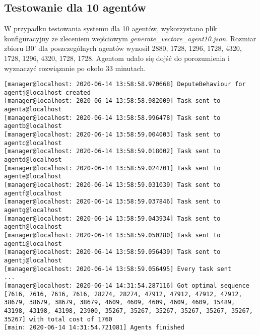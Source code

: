\subsection{Testowanie dla 10 agentów}
W przypadku testowania systemu dla 10 agentów, wykorzystano plik konfiguracyjny ze zleceniem wejściowym \textit{generate\_vectore\_agent10.json}. Rozmiar zbioru B0' dla poszczególnych agentów wynosił 2880, 1728, 1296, 1728, 4320, 1728, 1296, 4320, 1728, 1728. Agentom udało się dojść do porozumienia i wyznaczyć rozwiązanie po około 33 minutach.
\begin{lstlisting}
[manager@localhost: 2020-06-14 13:58:58.970668] DeputeBehaviour for agentj@localhost created
[manager@localhost: 2020-06-14 13:58:58.982009] Task sent to agenta@localhost
[manager@localhost: 2020-06-14 13:58:58.996478] Task sent to agentb@localhost
[manager@localhost: 2020-06-14 13:58:59.004003] Task sent to agentc@localhost
[manager@localhost: 2020-06-14 13:58:59.018002] Task sent to agentd@localhost
[manager@localhost: 2020-06-14 13:58:59.024701] Task sent to agente@localhost
[manager@localhost: 2020-06-14 13:58:59.031039] Task sent to agentf@localhost
[manager@localhost: 2020-06-14 13:58:59.037846] Task sent to agentg@localhost
[manager@localhost: 2020-06-14 13:58:59.043934] Task sent to agenth@localhost
[manager@localhost: 2020-06-14 13:58:59.050280] Task sent to agenti@localhost
[manager@localhost: 2020-06-14 13:58:59.056439] Task sent to agentj@localhost
[manager@localhost: 2020-06-14 13:58:59.056495] Every task sent
...
[manager@localhost: 2020-06-14 14:31:54.287116] Got optimal sequence [7616, 7616, 7616, 7616, 28274, 28274, 47912, 47912, 47912, 47912, 38679, 38679, 38679, 38679, 4609, 4609, 4609, 4609, 4609, 15489, 43198, 43198, 43198, 23900, 35267, 35267, 35267, 35267, 35267, 35267, 35267] with total cost of 1760
[main: 2020-06-14 14:31:54.721081] Agents finished
\end{lstlisting}
